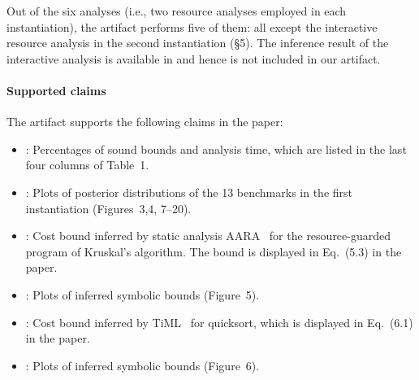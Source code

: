 Out of the six analyses (i.e., two resource analyses employed in each
instantiation), the artifact performs five of them: all except the interactive
resource analysis in the second instantiation (\S5).
%
The inference result of the interactive analysis is available in
\citet{Chargueraud2019} and hence is not included in our artifact.

\paragraph{Supported claims}

The artifact supports the following claims in the paper:
\begin{itemize}
  \item {}: Percentages of sound bounds
        and analysis time, which are listed in the last four columns of Table~1.
  \item {}: Plots of posterior
        distributions of the 13 benchmarks in the first instantiation
        (Figures~3,4, 7--20).
  \item {}: Cost bound inferred by static
        analysis AARA~\citep{Hoffmann2011a,Hoffmann2017} for the
        resource-guarded program of Kruskal's algorithm.
        The bound is displayed in Eq.~(5.3) in the paper.
  \item {}: Plots of inferred symbolic
        bounds (Figure~5).
  \item {}: Cost bound inferred by
        TiML~\citep{WangWC17} for quicksort, which is displayed in Eq.~(6.1) in
        the paper.
  \item {}: Plots of inferred symbolic
        bounds (Figure~6).
\end{itemize}
